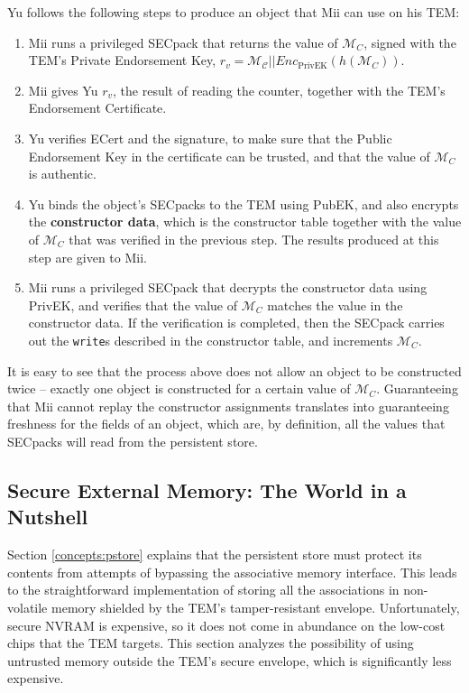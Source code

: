 Yu follows the following steps to produce an object that Mii can use on his
TEM:
\begin{enumerate}
	\item Mii runs a privileged SECpack that returns the value of
	$\mathcal{M}_C$, signed with the TEM's Private Endorsement Key, $r_v =
	\mathcal{M_C} || Enc_\textrm{PrivEK}(h(\mathcal{M}_C))$.
	\item Mii gives Yu $r_v$, the result of reading the
	counter, together with the TEM's Endorsement Certificate.
	\item Yu verifies ECert and the signature, to make sure that
	the Public Endorsement Key in the certificate can be trusted, and that
	the value of $\mathcal{M}_C$ is authentic.
	\item Yu binds the object's SECpacks to the TEM using PubEK,
	and also encrypts the \textbf{constructor data}, which is the constructor table
	together with the value of $\mathcal{M}_C$ that was verified in the previous step. The results produced
	at this step are given to Mii.
	\item Mii runs a privileged SECpack that decrypts the constructor data using
	PrivEK, and verifies that the value of $\mathcal{M}_C$ matches the value in
	the constructor data. If the verification is completed, then the SECpack
	carries out the \texttt{write}s described in the constructor table, and
	increments $\mathcal{M}_C$.
\end{enumerate}

It is easy to see that the process above does not allow an object
to be constructed twice -- exactly one object is constructed for a certain
value of $\mathcal{M}_C$. Guaranteeing that Mii cannot replay the constructor
assignments translates into guaranteeing freshness for the fields of an
object, which are, by definition, all the values that SECpacks will read
from the persistent store.

\subsection{Secure External Memory: The World in a
Nutshell}\label{arch:pstore_external}
Section \ref{concepts:pstore} explains that the persistent store must protect
its contents from attempts of bypassing the associative memory interface.
This leads to the straightforward implementation of storing all the
associations in non-volatile memory shielded by the TEM's tamper-resistant
envelope. Unfortunately, secure NVRAM is expensive, so it does not come in
abundance on the low-cost chips that the TEM targets. This section analyzes the
possibility of using untrusted memory outside the TEM's secure envelope, which
is significantly less expensive.

